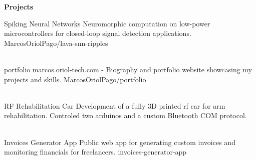 \begin{tcolorbox}[vercelcard]
\textcolor{DockerBlue}{\large\textbf{Projects}}

\vspace{8pt}

\projectitem
    {Spiking Neural Networks}
    {Neuromorphic computation on low-power microcontrollers for closed-loop signal detection applications.}
    {MarcosOriolPago/lava-snn-ripples}

\vspace{4pt}
\\[10pt]

\projectitem
    {portfolio}
    {marcos.oriol-tech.com - Biography and portfolio website showcasing my projects and skills.}
    {MarcosOriolPago/portfolio}
    
\vspace{4pt}
\\[10pt]

\projectitem
    {RF Rehabilitation Car}
    {Development of a fully 3D printed rf car for arm rehabilitation. Controled two arduinos and a custom Bluetooth COM protocol.}
    {}

\\[10pt]

\projectitem
    {Invoices Generator App}
    {Public web app for generating custom invoices and monitoring financials for freelancers.}
    {invoices-generator-app}

\vspace{4pt}
\\[10pt]

\end{tcolorbox}

